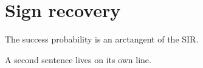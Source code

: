 \documentclass{article}
\begin{document}
\section{Sign recovery}

The success probability is an arctangent of the SIR.

A second sentence lives on its own line.
\end{document}
